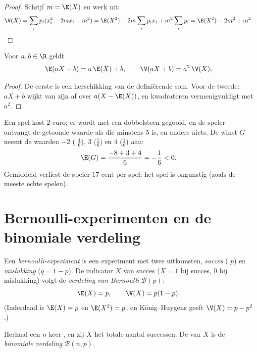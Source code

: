 \begin{proof}
Schrijf $m = \E(X)$ en werk uit:
\[
\V(X) = \sum_i p_i (x_i^2 - 2m x_i + m^2)
= \E(X^2) - 2m\sum_i p_i x_i + m^2\sum_i p_i
= \E(X^2) - 2m^2 + m^2 . \qedhere
\]
\end{proof}

\begin{proposition}\label{prop:g12:randvar:affine}
Voor $a, b \in \R$ geldt
\[
\E(aX + b) = a\,\E(X) + b, \qquad
\V(aX + b) = a^2\,\V(X) .
\]
\end{proposition}

\begin{proof}
De eerste is een herschikking van de definiërende som. Voor de tweede: $aX + b$
wijkt van zijn  af over $a(X - \E(X))$, en kwadrateren
vermenigvuldigt met $a^2$.
\end{proof}

\begin{example}\label{ex:g12:randvar:game}
Een spel kost $2$ euro; er wordt met een dobbelsteen gegooid, en de speler
ontvangt de getoonde waarde als die minstens $5$ is, en anders niets. De winst
$G$ neemt de waarden $-2$ ( $\frac46$), $3$ ($\frac16$) en $4$
($\frac16$) aan:
\[
\E(G) = \frac{-8 + 3 + 4}{6} = -\frac{1}{6} < 0 .
\]
Gemiddeld verliest de speler $17$ cent per spel: het spel is ongunstig (zoals
de meeste echte spelen).
\end{example}

\section{Bernoulli-experimenten en de binomiale verdeling}

\begin{definition}\label{def:g12:randvar:bernoulli}
Een \emph{bernoulli-experiment} is een experiment
met twee uitkomsten, \emph{succes} ( $p$) en \emph{mislukking}
($q = 1 - p$). De indicator $X$ van succes ($X = 1$ bij succes, $0$ bij
mislukking) volgt de \emph{verdeling van Bernoulli} $\mathcal B(p)$:
\[
\E(X) = p, \qquad \V(X) = p(1-p) .
\]
(Inderdaad is $\E(X) = p$ en $\E(X^2) = p$, en König--Huygens geeft
$\V(X) = p - p^2$.)
\end{definition}

\begin{definition}\label{def:g12:randvar:binomial}
Herhaal een  $n$ keer , en zij $X$ het totale
aantal successen. De  van $X$ is de \emph{binomiale
verdeling} $\mathcal B(n, p)$.
\end{definition}

